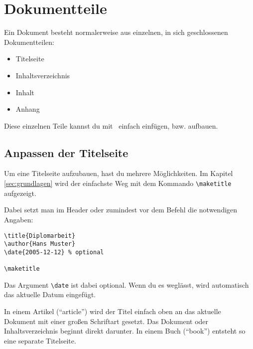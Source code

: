%
%

\chapter{Dokumentteile}

Ein Dokument besteht normalerweise aus einzelnen, in sich geschlossenen Dokumentteilen:

\begin{itemize}
	\item Titelseite
	\item Inhaltsverzeichnis
	\item Inhalt
	\item Anhang
\end{itemize}

Diese einzelnen Teile kannst du mit \DMLLaTeX \ einfach einfügen, bzw. aufbauen.

\section{Anpassen der Titelseite}

Um eine Titelseite aufzubauen, hast du mehrere Möglichkeiten. Im Kapitel \ref{sec:grundlagen} wird der einfachste Weg mit dem Kommando \texttt{\textbackslash maketitle} aufgezeigt.

Dabei setzt man im Header oder zumindest vor dem Befehl die notwendigen Angaben:
\begin{lstlisting}
\title{Diplomarbeit}
\author{Hans Muster}
\date{2005-12-12} % optional

\maketitle
\end{lstlisting}

Das Argument \texttt{\textbackslash date} ist dabei optional. Wenn du es weglässt, wird automatisch das aktuelle Datum eingefügt. 

In einem Artikel (\enquote{article}) wird der Titel einfach oben an das aktuelle Dokument mit einer großen Schriftart gesetzt. Das Dokument oder Inhaltsverzeichnis beginnt direkt darunter. In einem Buch (\enquote{book}) entsteht so eine separate Titelseite.

